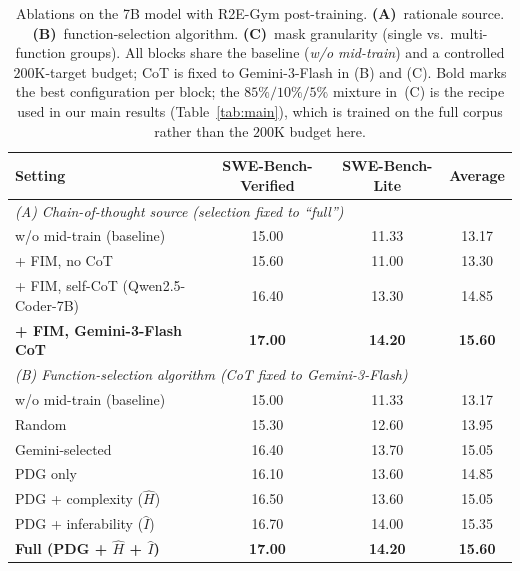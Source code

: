 \begin{table}[t]
\centering
\caption{Ablations on the 7B model with R2E-Gym post-training.
\textbf{(A)}~rationale source. \textbf{(B)}~function-selection algorithm.
\textbf{(C)}~mask granularity (single vs.\ multi-function groups).
All blocks share the baseline (\emph{w/o mid-train}) and a controlled
$200$K-target budget; CoT is fixed to Gemini-3-Flash in (B) and (C).
Bold marks the best configuration per block; the $85\%/10\%/5\%$ mixture
in~(C) is the recipe used in our main results (Table~\ref{tab:main}),
which is trained on the full corpus rather than the $200$K budget here.}
\label{tab:ablation}
\small
\setlength{\tabcolsep}{8pt}
\begin{tabular}{lccc}
\toprule
Setting & SWE-Bench-Verified & SWE-Bench-Lite & Average \\
\midrule
\multicolumn{4}{l}{\emph{(A) Chain-of-thought source (selection fixed to ``full'')}} \\
\midrule
w/o mid-train (baseline)                  & 15.00 & 11.33 & 13.17 \\
+ FIM, no CoT                             & 15.60 & 11.00 & 13.30 \\
+ FIM, self-CoT (Qwen2.5-Coder-7B)        & 16.40 & 13.30 & 14.85 \\
\textbf{+ FIM, Gemini-3-Flash CoT}        & \textbf{17.00} & \textbf{14.20} & \textbf{15.60} \\
\midrule
\multicolumn{4}{l}{\emph{(B) Function-selection algorithm (CoT fixed to Gemini-3-Flash)}} \\
\midrule
w/o mid-train (baseline)                    & 15.00 & 11.33 & 13.17 \\
Random                                      & 15.30 & 12.60 & 13.95 \\
Gemini-selected                             & 16.40 & 13.70 & 15.05 \\
PDG only                                    & 16.10 & 13.60 & 14.85 \\
PDG + complexity ($\hat{H}$)                & 16.50 & 13.60 & 15.05 \\
PDG + inferability ($\hat{I}$)              & 16.70 & 14.00 & 15.35 \\
\textbf{Full (PDG + $\hat{H}$ + $\hat{I}$)} & \textbf{17.00} & \textbf{14.20} & \textbf{15.60} \\

\end{tabular}
\end{table}
